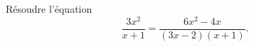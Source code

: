 
\begin{exercice}\label{exosmath-0352}

Résoudre l'équation
\begin{equation}
    \frac{ 3x^2 }{ x+1 }=\frac{ 6x^2-4x }{ (3x-2)(x+1) }.
\end{equation}

\end{exercice}

